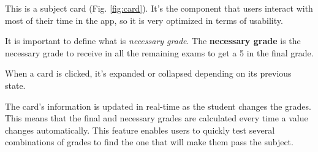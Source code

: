 This is a subject card (Fig. \ref{fig:card}). It's the component that users interact with most of their time in the app, so it is very optimized in terms of usability. 

It is important to define what is \textit{necessary grade}. The \textbf{necessary grade} is the necessary grade to receive in all the remaining exams to get a 5 in the final grade. %

When a card is clicked, it's expanded or collapsed depending on its previous state.

The card's information is updated in real-time as the student changes the grades. This means that the final and necessary grades are calculated every time a value changes automatically. This feature enables users to quickly test several combinations of grades to find the one that will make them pass the subject.

